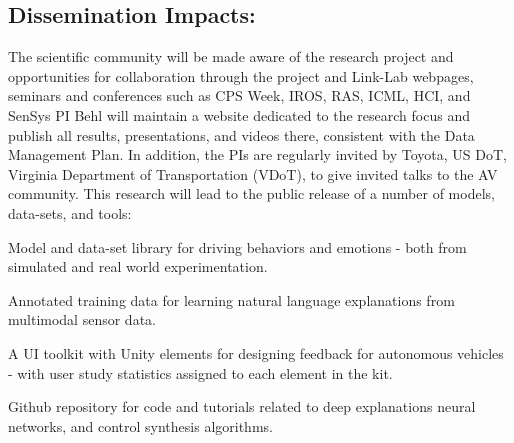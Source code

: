 \subsection{Dissemination Impacts:}
The scientific community will be made aware of the research project and opportunities for collaboration through the project and Link-Lab webpages, seminars and conferences such as CPS Week, IROS, RAS, ICML, HCI, and SenSys
PI Behl will maintain a website dedicated to the research focus and publish all results, presentations, and videos there, consistent with the Data Management Plan. 
In addition, the PIs are regularly invited by Toyota, US DoT, Virginia Department of Transportation (VDoT), to give invited talks to the AV community.
This research will lead to the public release of a number of models, data-sets, and tools:
\begin{enumerate*}
    \item Model and data-set library for driving behaviors and emotions - both from simulated and real world experimentation. 
    \item Annotated training data for learning natural language explanations from multimodal sensor data.
    \item A UI toolkit with Unity elements for designing feedback for autonomous vehicles - with user study statistics assigned to each element in the kit.
    \item Github repository for code and tutorials related to deep explanations neural networks, and control synthesis algorithms. 
\end{enumerate*}
